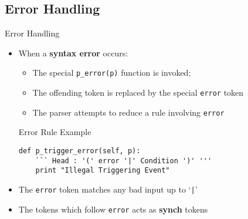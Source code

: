 \subsection{Error Handling}
\begin{frame}[fragile]{Error Handling}
  \begin{itemize}
    \item When a \textbf{syntax error} occurs: 
    \begin{itemize}
      \item The special \texttt{p\_error(p)} function is invoked;
      \item The offending token is replaced by the special \texttt{error} 
      token
      \item The parser attempts to reduce a rule involving \texttt{error}
    \end{itemize}
\n
\begin{exampleblock}{Error Rule Example}
\begin{verbatim}
def p_trigger_error(self, p):
    ``` Head : '(' error '|' Condition ')' '''
    print "Illegal Triggering Event"
\end{verbatim}
\end{exampleblock}
\n
   \item The \texttt{error} token matches any bad input up to `\texttt{|}'
\n
    \item The tokens which follow \texttt{error} acts as \textbf{synch} 
    tokens

  \end{itemize}
%
%
\N\N
\end{frame}



